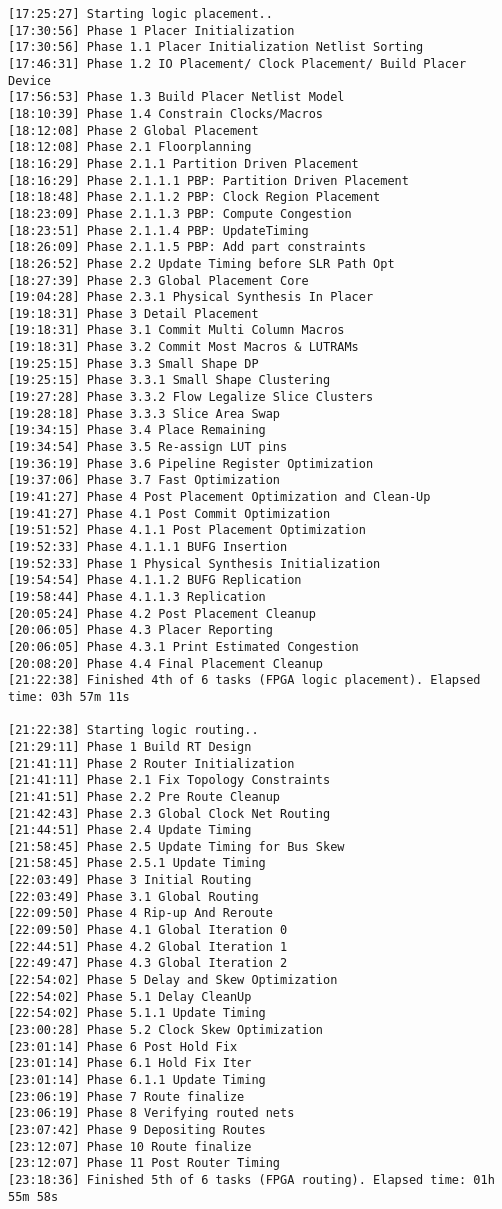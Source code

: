 \begin{lstlisting}[label=func,breaklines=true,breakatwhitespace=false,caption=СОДЕРЖИМОЕ LOG-ФАЙЛА.]
[17:25:27] Starting logic placement..
[17:30:56] Phase 1 Placer Initialization
[17:30:56] Phase 1.1 Placer Initialization Netlist Sorting
[17:46:31] Phase 1.2 IO Placement/ Clock Placement/ Build Placer Device
[17:56:53] Phase 1.3 Build Placer Netlist Model
[18:10:39] Phase 1.4 Constrain Clocks/Macros
[18:12:08] Phase 2 Global Placement
[18:12:08] Phase 2.1 Floorplanning
[18:16:29] Phase 2.1.1 Partition Driven Placement
[18:16:29] Phase 2.1.1.1 PBP: Partition Driven Placement
[18:18:48] Phase 2.1.1.2 PBP: Clock Region Placement
[18:23:09] Phase 2.1.1.3 PBP: Compute Congestion
[18:23:51] Phase 2.1.1.4 PBP: UpdateTiming
[18:26:09] Phase 2.1.1.5 PBP: Add part constraints
[18:26:52] Phase 2.2 Update Timing before SLR Path Opt
[18:27:39] Phase 2.3 Global Placement Core
[19:04:28] Phase 2.3.1 Physical Synthesis In Placer
[19:18:31] Phase 3 Detail Placement
[19:18:31] Phase 3.1 Commit Multi Column Macros
[19:18:31] Phase 3.2 Commit Most Macros & LUTRAMs
[19:25:15] Phase 3.3 Small Shape DP
[19:25:15] Phase 3.3.1 Small Shape Clustering
[19:27:28] Phase 3.3.2 Flow Legalize Slice Clusters
[19:28:18] Phase 3.3.3 Slice Area Swap
[19:34:15] Phase 3.4 Place Remaining
[19:34:54] Phase 3.5 Re-assign LUT pins
[19:36:19] Phase 3.6 Pipeline Register Optimization
[19:37:06] Phase 3.7 Fast Optimization
[19:41:27] Phase 4 Post Placement Optimization and Clean-Up
[19:41:27] Phase 4.1 Post Commit Optimization
[19:51:52] Phase 4.1.1 Post Placement Optimization
[19:52:33] Phase 4.1.1.1 BUFG Insertion
[19:52:33] Phase 1 Physical Synthesis Initialization
[19:54:54] Phase 4.1.1.2 BUFG Replication
[19:58:44] Phase 4.1.1.3 Replication
[20:05:24] Phase 4.2 Post Placement Cleanup
[20:06:05] Phase 4.3 Placer Reporting
[20:06:05] Phase 4.3.1 Print Estimated Congestion
[20:08:20] Phase 4.4 Final Placement Cleanup
[21:22:38] Finished 4th of 6 tasks (FPGA logic placement). Elapsed time: 03h 57m 11s 

[21:22:38] Starting logic routing..
[21:29:11] Phase 1 Build RT Design
[21:41:11] Phase 2 Router Initialization
[21:41:11] Phase 2.1 Fix Topology Constraints
[21:41:51] Phase 2.2 Pre Route Cleanup
[21:42:43] Phase 2.3 Global Clock Net Routing
[21:44:51] Phase 2.4 Update Timing
[21:58:45] Phase 2.5 Update Timing for Bus Skew
[21:58:45] Phase 2.5.1 Update Timing
[22:03:49] Phase 3 Initial Routing
[22:03:49] Phase 3.1 Global Routing
[22:09:50] Phase 4 Rip-up And Reroute
[22:09:50] Phase 4.1 Global Iteration 0
[22:44:51] Phase 4.2 Global Iteration 1
[22:49:47] Phase 4.3 Global Iteration 2
[22:54:02] Phase 5 Delay and Skew Optimization
[22:54:02] Phase 5.1 Delay CleanUp
[22:54:02] Phase 5.1.1 Update Timing
[23:00:28] Phase 5.2 Clock Skew Optimization
[23:01:14] Phase 6 Post Hold Fix
[23:01:14] Phase 6.1 Hold Fix Iter
[23:01:14] Phase 6.1.1 Update Timing
[23:06:19] Phase 7 Route finalize
[23:06:19] Phase 8 Verifying routed nets
[23:07:42] Phase 9 Depositing Routes
[23:12:07] Phase 10 Route finalize
[23:12:07] Phase 11 Post Router Timing
[23:18:36] Finished 5th of 6 tasks (FPGA routing). Elapsed time: 01h 55m 58s 


\end{lstlisting}
